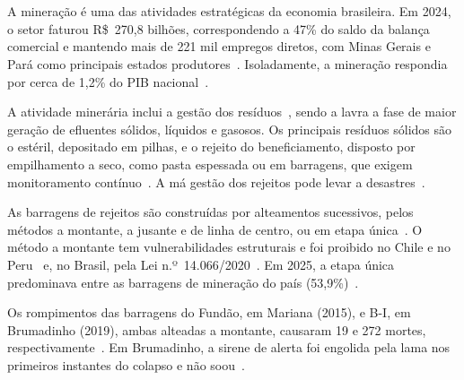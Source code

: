 \chapter*{}
\noindent
{}



\vspace{1.4cm}

A mineração é uma das atividades estratégicas da economia brasileira.
Em 2024, o setor faturou R\$~270,8 bilhões, correspondendo a 47\% do saldo da balança comercial e mantendo mais de 221 mil empregos diretos, com
Minas Gerais e Pará como principais estados produtores~\cite{ibram2024}. Isoladamente, a mineração respondia por cerca de
1,2\% do PIB nacional~\cite{apc2024}.

A atividade minerária inclui a gestão dos resíduos~\cite{brasil2018}, sendo a lavra a fase de maior geração de efluentes sólidos, líquidos e
gasosos. Os principais resíduos sólidos são o estéril, depositado em
pilhas, e o rejeito do beneficiamento, disposto por empilhamento a
seco, como pasta espessada ou em barragens, que exigem monitoramento
contínuo~\cite{carvalho2018, freire2020}. A má gestão dos rejeitos pode
levar a desastres~\cite{ipea2017boletim}.

As barragens de rejeitos são construídas por alteamentos sucessivos,
pelos métodos a montante, a jusante e de linha de centro, ou em etapa
única~\cite{araujo2006, ibram2016, vale2024}. O método a montante tem
vulnerabilidades estruturais e foi proibido no Chile e no Peru~\cite{thome2018} e, no Brasil, pela Lei n.º~14.066/2020~\cite{brasil2020lei14066}. Em 2025, a etapa única predominava entre
as barragens de mineração do país (53,9\%)~\cite{anmsistema2020}.

Os rompimentos das barragens do Fundão, em Mariana (2015), e B-I, em
Brumadinho (2019), ambas alteadas a montante, causaram 19 e 272 mortes,
respectivamente~\cite{estadominas2016irregular, brasil2024timeline,
guitarrara2026rompimento}. Em Brumadinho, a sirene de alerta foi
engolida pela lama nos primeiros instantes do colapso e não soou~\cite{taliberti2025tragedia, metropoles2019laudos}.


